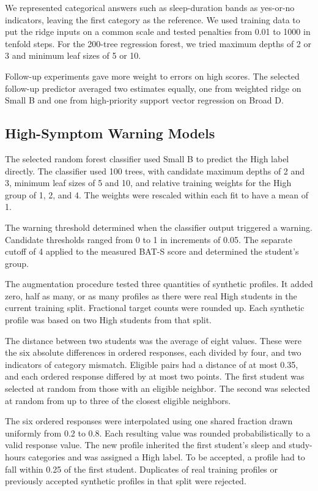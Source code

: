 We represented categorical answers such as sleep-duration bands as yes-or-no indicators, leaving the first category as the reference. We used training data to put the ridge inputs on a common scale and tested penalties from 0.01 to 1000 in tenfold steps. For the 200-tree regression forest, we tried maximum depths of 2 or 3 and minimum leaf sizes of 5 or 10.

Follow-up experiments gave more weight to errors on high scores. The selected follow-up predictor averaged two estimates equally, one from weighted ridge on Small B and one from high-priority support vector regression on Broad D.

\subsection{High-Symptom Warning Models}

The selected random forest classifier used Small B to predict the High label directly. The classifier used 100 trees, with candidate maximum depths of 2 and 3, minimum leaf sizes of 5 and 10, and relative training weights for the High group of 1, 2, and 4. The weights were rescaled within each fit to have a mean of 1.

The warning threshold determined when the classifier output triggered a warning. Candidate thresholds ranged from 0 to 1 in increments of 0.05. The separate cutoff of 4 applied to the measured BAT-S score and determined the student's group.

The augmentation procedure tested three quantities of synthetic profiles. It added zero, half as many, or as many profiles as there were real High students in the current training split. Fractional target counts were rounded up. Each synthetic profile was based on two High students from that split.

The distance between two students was the average of eight values. These were the six absolute differences in ordered responses, each divided by four, and two indicators of category mismatch. Eligible pairs had a distance of at most 0.35, and each ordered response differed by at most two points. The first student was selected at random from those with an eligible neighbor. The second was selected at random from up to three of the closest eligible neighbors.

The six ordered responses were interpolated using one shared fraction drawn uniformly from 0.2 to 0.8. Each resulting value was rounded probabilistically to a valid response value. The new profile inherited the first student's sleep and study-hours categories and was assigned a High label. To be accepted, a profile had to fall within 0.25 of the first student. Duplicates of real training profiles or previously accepted synthetic profiles in that split were rejected.

